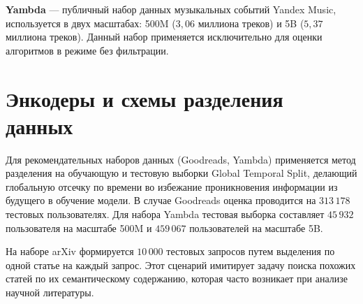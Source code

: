 \documentclass[14pt,a4paper]{extreport}
\numberwithin{figure}{chapter}
\numberwithin{table}{chapter}
\numberwithin{equation}{chapter}
\begin{document}
\textbf{Yambda} \cite{yandex2025yambda} --- публичный набор данных музыкальных событий Yandex Music, используется в двух масштабах: 500M ($3{,}06$ миллиона треков) и 5B ($5{,}37$ миллиона треков). Данный набор применяется исключительно для оценки алгоритмов в режиме без фильтрации.

\section{Энкодеры и схемы разделения данных}

Для рекомендательных наборов данных (Goodreads, Yambda) применяется метод разделения на обучающую и тестовую выборки Global Temporal Split, делающий глобальную отсечку по времени во избежание проникновения информации из будущего в обучение модели. В случае Goodreads оценка проводится на $313\,178$ тестовых пользователях. Для набора Yambda тестовая выборка составляет $45\,932$ пользователя на масштабе 500M и $459\,067$ пользователей на масштабе 5B. 

На наборе arXiv формируется $10\,000$ тестовых запросов путем выделения по одной статье на каждый запрос. Этот сценарий имитирует задачу поиска похожих статей по их семантическому содержанию, которая часто возникает при анализе научной литературы.
\end{document}
